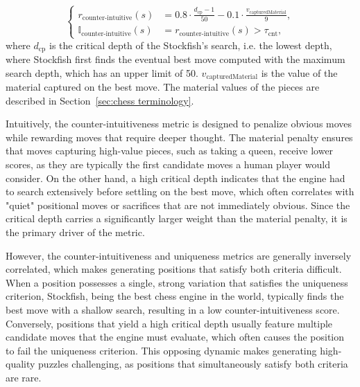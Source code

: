 \begin{equation}
    \left\{
        \begin{aligned}
            r_{\text{counter-intuitive}}(s) &= 0.8 \cdot \frac{d_{\text{cp}} - 1}{50} - 0.1 \cdot \frac{v_{\text{capturedMaterial}}}{9}, \\
            \mathbb{I}_{\text{counter-intuitive}}(s) &= r_{\text{counter-intuitive}}(s) > \tau_{\text{cnt}} ,
        \end{aligned}
    \right.
    \label{eq:counter intuitive}
\end{equation}
where $d_{\text{cp}}$ is the critical depth of the Stockfish's search, i.e. the lowest depth, where Stockfish first finds the eventual best move computed with the maximum search depth, which has an upper limit of 50. $v_{\text{capturedMaterial}}$ is the value of the material captured on the best move. The material values of the pieces are described in Section~\ref{sec:chess terminology}.

Intuitively, the counter-intuitiveness metric is designed to penalize obvious moves while rewarding moves that require deeper thought. The material penalty ensures that moves capturing high-value pieces, such as taking a queen, receive lower scores, as they are typically the first candidate moves a human player would consider. On the other hand, a high critical depth indicates that the engine had to search extensively before settling on the best move, which often correlates with "quiet" positional moves or sacrifices that are not immediately obvious. Since the critical depth carries a significantly larger weight than the material penalty, it is the primary driver of the metric.

However, the counter-intuitiveness and uniqueness metrics are generally inversely correlated, which makes generating positions that satisfy both criteria difficult. When a position possesses a single, strong variation that satisfies the uniqueness criterion, Stockfish, being the best chess engine in the world, typically finds the best move with a shallow search, resulting in a low counter-intuitiveness score. Conversely, positions that yield a high critical depth usually feature multiple candidate moves that the engine must evaluate, which often causes the position to fail the uniqueness criterion. This opposing dynamic makes generating high-quality puzzles challenging, as positions that simultaneously satisfy both criteria are rare.



